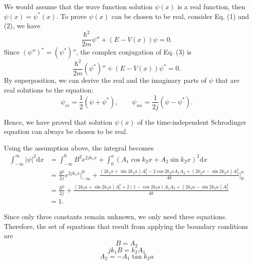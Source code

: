 \documentclass[a4paper]{article}
\begin{document}
We would assume that the wave function solution $\psi(x)$ is a real function, then $\psi(x)=\psi^*(x)$. To prove $\psi(x)$ can be chosen to be real, consider Eq. (1) and (2), we have
\begin{equation}
    \frac{\hbar^2}{2m}\psi''+(E-V(x))\psi=0.
\end{equation}
Since $(\psi'')^*=(\psi^*)''$, the complex conjugation of Eq. (3) is
$$\frac{\hbar^2}{2m}(\psi^*)''+(E-V(x))\psi^*=0.$$
By superposition, we can derive the real and the imaginary parts of $\psi$ that are real solutions to the equation:
$$\psi_{re}=\frac{1}{2}(\psi+\psi^*),\qquad\psi_{im}=\frac{1}{2j}(\psi-\psi^*).$$

Hence, we have proved that solution $\psi(x)$ of the time-independent Schrodinger equation can always be chosen to be real.

Using the assumption above, the integral becomes
\[
    \begin{aligned}
        \int_{-\infty}^\infty|\psi|^2\mathrm{d}x
        &=\int_{-\infty}^0B^2e^{2jk_1x}+\int_0^a(A_1\cos{k_2x}+A_2\sin{k_2x})^2\mathrm{d}x\\
        &=\frac{B^2}{2j}e^{2jk_1x}\bigg|_{-\infty}^0+\frac{(2k_2x+\sin{2k_2x})A_1^2-2\cos{2k_2x}A_1A_2+(2k_2x-\sin{2k_2x})A_2^2}{4k}\bigg|_0^a\\
        &=\frac{B^2}{2j}+\frac{(2k_2a+\sin{2k_2a})A_1^2+2(1-\cos{2k_2a})A_1A_2+(2k_2a-\sin{2k_2a})A_2^2}{4k}\\
        &=1.
    \end{aligned}
\]

Since only three constants remain unknown, we only need three equations. Therefore, the set of equations that result from applying the boundary conditions are
\begin{equation}
    B=A_2
\end{equation}
\begin{equation}
    jk_1B=k_2A_1
\end{equation}
\begin{equation}
    A_2=-A_1\tan{k_2a}
\end{equation}
\end{document}

